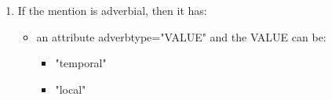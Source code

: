 \documentclass[a4paper]{article}
\begin{document}
\begin{enumerate}
\item If the mention is adverbial, then it has:

\begin{itemize}
\item an attribute adverbtype="VALUE" and the VALUE can be:
\begin{itemize}
\item "temporal"
\item "local"
\end{itemize}
\end{itemize}

\end{enumerate}



\end{document}
